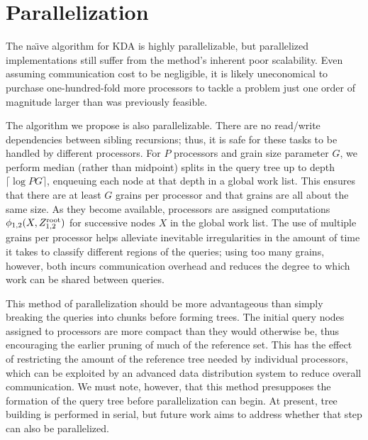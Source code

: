 \documentclass[twoside,leqno,twocolumn]{article}
\newcommand{\kdroot}[1]{#1^{\rm root}}
\begin{document}
\section{Parallelization}\label{sec:para}
The na\"{\i}ve algorithm for KDA is highly parallelizable, but
parallelized implementations still suffer from the method's inherent
poor scalability.  Even assuming communication cost to be negligible,
it is likely uneconomical to purchase one-hundred-fold more processors
to tackle a problem just one order of magnitude larger than was
previously feasible.

The algorithm we propose is also parallelizable.  There are no
read/write dependencies between sibling recursions; thus, it is safe
for these tasks to be handled by different processors.  For $P$
processors and grain size parameter $G$, we perform median (rather
than midpoint) splits in the query tree up to depth $\lceil \log PG
\rceil$, enqueuing each node at that depth in a global work list.
This ensures that there are at least $G$ grains per processor and that
grains are all about the same size.  As they become available,
processors are assigned computations $\phi_{1,2}(X,\kdroot{Z_{1,2}})$
for successive nodes $X$ in the global work list.  The use of multiple
grains per processor helps alleviate inevitable irregularities in the
amount of time it takes to classify different regions of the queries;
using too many grains, however, both incurs communication overhead and
reduces the degree to which work can be shared between queries.

This method of parallelization should be more advantageous than simply
breaking the queries into chunks before forming trees.  The initial
query nodes assigned to processors are more compact than they would
otherwise be, thus encouraging the earlier pruning of much of the
reference set.  This has the effect of restricting the amount of the
reference tree needed by individual processors, which can be exploited
by an advanced data distribution system to reduce overall
communication.  We must note, however, that this method presupposes
the formation of the query tree before parallelization can begin.  At
present, tree building is performed in serial, but future work aims to
address whether that step can also be parallelized.
\end{document}

